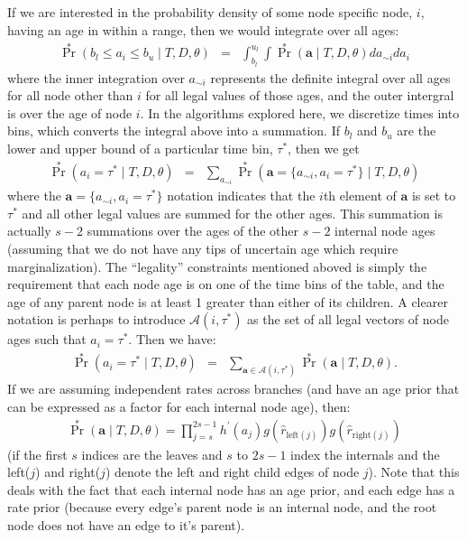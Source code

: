 \documentclass{llncs}
\begin{document}
If we are interested in the probability density of some node specific node, $i$, having an age in within a range,
 then we would integrate over all ages:
\begin{eqnarray}
    \Pr^{\ast}(b_l \leq a_i \leq b_u \mid T, D, \theta) & = & \int_{b_l}^{u_l} \int \Pr^{\ast}(\mathbf{a} \mid T, D, \theta) d a_{\sim i} d a_i
\end{eqnarray}
where the inner integration over $a_{\sim i}$ represents the definite integral over all 
    ages for all node other than $i$ for all legal values of those ages, and the outer
    intergral is over the age of node $i$.
In the algorithms explored here, we discretize times into bins, which converts the integral
    above into a summation.
If $b_l$ and $b_u$ are the lower and upper bound of a particular time bin, $\tau^{\ast}$, then we get
\begin{eqnarray}
    \Pr^{\ast}(a_i = \tau^{\ast} \mid T, D, \theta) & = & \sum_{a_{\sim i}} \Pr^{\ast}\left(\mathbf{a} = \{a_{\sim i}, a_i = \tau^{\ast}\} \mid T, D, \theta\right)
\end{eqnarray}
where the $\mathbf{a} = \{a_{\sim i}, a_i = \tau^{\ast}\}$ notation indicates that the $i$th element of $\mathbf{a}$
    is set to $\tau^{\ast}$ and all other legal values are summed for the other ages.
This summation is actually $s-2$ summations over the ages of the other $s-2$ internal node ages (assuming that we do 
    not have any tips of uncertain age which require marginalization).
The ``legality'' constraints mentioned aboved is simply the requirement that each node age is on one of the 
    time bins of the table, and the age of any parent node is at least 1 greater than either of its children.
A clearer notation is perhaps to introduce $\mathcal{A}\left(i,\tau^{\ast}\right)$ as the set of all legal
    vectors of node ages such that $a_i = \tau^{\ast}$.
Then we have:
\begin{eqnarray}
    \Pr^{\ast}(a_i = \tau^{\ast} \mid T, D, \theta) & = & \sum_{\mathbf{a} \in \mathcal{A}\left(i,\tau^{\ast}\right)}\Pr^{\ast}\left(\mathbf{a} \mid T, D, \theta\right). \label{ageSum}
\end{eqnarray}
If we are assuming independent rates across branches (and have an age prior that can be expressed as a factor for each internal node age), then:
\begin{eqnarray}
     \Pr^{\ast}\left(\mathbf{a} \mid T, D, \theta\right) = \prod_{j=s}^{2s-1} h^{\prime}(a_j)g(\hat{r}_{\mbox{left}(j)})g(\hat{r}_{\mbox{right}(j)})
\end{eqnarray}
(if the first $s$ indices are the leaves and $s$ to $2s-1$ index the internals and the left($j$) and right($j$) denote the left and right child edges of node $j$).
Note that this deals with the fact that each internal node has an age prior, and
    each edge has a rate prior (because every edge's parent node is an internal node, and the root node does not 
    have an edge to it's parent).
\end{document}
